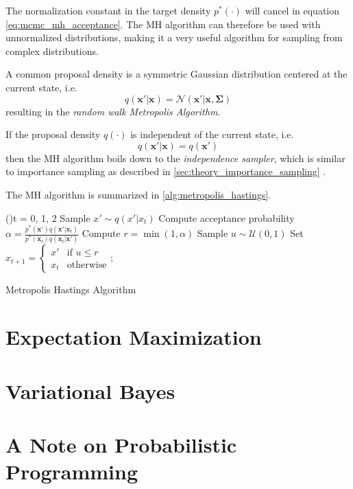 The normalization constant in the target density $p^*(\cdot)$ will cancel in equation \eqref{eq:mcmc_mh_acceptance}. The MH algorithm can therefore be used with unnormalized distributions, making it a very useful algorithm for sampling from complex distributions. 

A common proposal density is a symmetric Gaussian distribution centered at the current state, i.e. $$q(\mathbf{x'} | \mathbf{x}) = \mathcal{N}(\mathbf{x'} | \mathbf{x}, \boldsymbol{\Sigma})$$ resulting in the \textit{random walk Metropolis Algorithm}.

If the proposal density $q(\cdot)$ is independent of the current state, i.e. $$q(\mathbf{x'} | \mathbf{x}) = q(\mathbf{x'})$$ then the MH algorithm boils down to the \textit{independence sampler}, which is similar to importance sampling as described in \cref{sec:theory_importance_sampling} \cite{murphy}.

The MH algorithm is summarized in \cref{alg:metropolis_hastings}.
\begin{algorithm}\label{alg:metropolis_hastings}
\SetAlgoLined
\For(){t = 0, 1, 2}{
    Sample $x' \sim q(x' | x_t)$ \;
    Compute acceptance probability \\
    $\alpha = \frac{p^*(\mathbf{x'}) q(\mathbf{x'} | \mathbf{x}_t)}{p^*(\mathbf{x}_t) q(\mathbf{x}_t | \mathbf{x'})}$\;
    Compute $r = \min(1, \alpha)$\;
    Sample $u \sim \mathcal{U}(0, 1)$\;
    Set $x_{t+1} = \begin{cases}x' & \text{if } u \leq r\\x_t & \text{otherwise}\end{cases}$;
}
\caption{Metropolis Hastings Algorithm}
\end{algorithm}

\section{Expectation Maximization}

\section{Variational Bayes}

\section{A Note on Probabilistic Programming}

